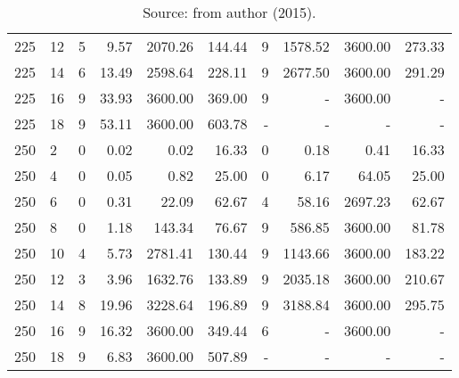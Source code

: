 \begin{appendices}
\begin{table*}
\begin{center}
\begin{tabular} {l l | r r r r | r r r r}
225 & 12  &  5            &  9.57          &  2070.26     &  144.44    &  9           &  1578.52         &  3600.00    &  273.33    \\ 
225 & 14  &  6            &  13.49         &  2598.64     &  228.11    &  9           &  2677.50         &  3600.00    &  291.29    \\ 
225 & 16  &  9            &  33.93         &  3600.00     &  369.00    &  9           &  -               &  3600.00    &  -         \\ 
225 & 18  &  9            &  53.11         &  3600.00     &  603.78    &  -           &  -               &  -          &  -         \\ 
250 & 2   &  0            &  0.02          &  0.02        &  16.33     &  0           &  0.18            &  0.41       &  16.33     \\ 
250 & 4   &  0            &  0.05          &  0.82        &  25.00     &  0           &  6.17            &  64.05      &  25.00     \\ 
250 & 6   &  0            &  0.31          &  22.09       &  62.67     &  4           &  58.16           &  2697.23    &  62.67     \\ 
250 & 8   &  0            &  1.18          &  143.34      &  76.67     &  9           &  586.85          &  3600.00    &  81.78     \\ 
250 & 10  &  4            &  5.73          &  2781.41     &  130.44    &  9           &  1143.66         &  3600.00    &  183.22    \\ 
250 & 12  &  3            &  3.96          &  1632.76     &  133.89    &  9           &  2035.18         &  3600.00    &  210.67    \\ 
250 & 14  &  8            &  19.96         &  3228.64     &  196.89    &  9           &  3188.84         &  3600.00    &  295.75    \\ 
250 & 16  &  9            &  16.32         &  3600.00     &  349.44    &  6           &  -               &  3600.00    &  -         \\ 
250 & 18  &  9            &  6.83          &  3600.00     &  507.89    &  -           &  -               &  -          &  -         \\
\hline
\end{tabular}\caption*{Source: from author (2015).}
\end{center}
\end{table*}



\end{appendices}

